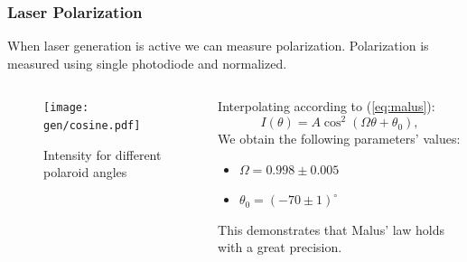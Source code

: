 \documentclass{beamer}
\begin{document}
	
	\begin{frame}
		\frametitle{Laser Polarization}
		When laser generation is active we can measure polarization. Polarization is measured using single photodiode and normalized.
		\vspace{-20pt}
		\begin{columns}
			\begin{column}{0.6\textwidth}
				\begin{figure}
					\centering
					\texttt{[image: gen/cosine.pdf]}
					\caption{Intensity for different polaroid angles}
				\end{figure}
			\end{column}
			\begin{column}{0.4\textwidth}
				Interpolating according to (\ref{eq:malus}):
				$$I(\theta) = A \cos^2{(\Omega \theta + \theta_0)},$$
				We obtain the following parameters' values: 
				
				\begin{itemize}
					\item[] $\Omega = 0.998 \pm 0.005$
					\item[] $\theta_0 = (-70 \pm 1)^\circ$
				\end{itemize}
			
			This demonstrates that Malus' law holds with a great precision.
			\end{column}
		\end{columns}
		
		
	\end{frame}
\end{document}
